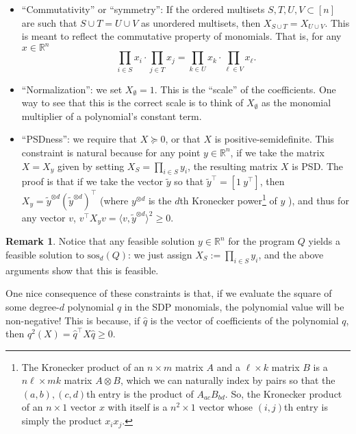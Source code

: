 \documentclass[a4paper,11pt]{article}
\newcommand{\R}{\mathbb{R}}
\newcommand{\sos}{\mathrm{sos}}
\theoremstyle{definition}
\newtheorem{remark}{Remark}
\begin{document}
\begin{itemize}
\item ``Commutativity'' or ``symmetry'': If the ordered multisets $S,T,U,V \subset [n]$ are such that $S \cup T = U \cup V$ as unordered multisets, then $X_{S\cup T} = X_{U \cup V}$.
This is meant to reflect the commutative property of monomials. 
That is, for any $x\in \R^n$
\[
\prod_{i \in S}x_i \cdot \prod_{j\in T}x_j = \prod_{k \in U}x_k \cdot \prod_{\ell \in V} x_{\ell}.
\]
\item ``Normalization'': we set $X_{\emptyset} = 1$.
This is the ``scale'' of the coefficients.
One way to see that this is the correct scale is to think of $X_{\emptyset}$ as the monomial multiplier of a polynomial's constant term.
\item ``PSDness'': we require that $X \succeq 0$, or that $X$ is positive-semidefinite.
This constraint is natural because for any point $y \in \R^n$, if we take the matrix $X=X_y$ given by setting $X_{S} = \prod_{i\in S} y_i$, the resulting matrix $X$ is PSD.
The proof is that if we take the vector $\tilde{y}$ so that $\tilde{y}^{\top} = [1 \ y^\top]$, then $X_y = \tilde{y}^{\otimes d}(\tilde{y}^{\otimes d})^\top$ (where $y^{\otimes d}$ is the $d$th Kronecker power\footnote{The Kronecker product of an $n \times m$ matrix $A$ and a $\ell \times k$ matrix $B$ is a $n\ell \times mk$ matrix $A \otimes B$, which we can naturally index by pairs so that the $(a,b),(c,d)$th entry is the product of $A_{ac}B_{bd}$. 
So, the Kronecker product of an $n \times 1$ vector $x$ with itself is a $n^2 \times 1$ vector whose $(i,j)$th entry is simply the product $x_ix_j$.}
of $y$
), and thus for any vector $v$, $v^\top X_yv = \langle v, \tilde{y}^{\otimes d}\rangle^2 \ge 0$.  

\end{itemize}

\begin{remark}
Notice that any feasible solution $y \in \R^n$ for the program $Q$ yields a feasible solution to $\sos_d(Q)$: we just assign $X_S := \prod_{i\in S}y_i$, and the above arguments show that this is feasible.
\end{remark}

One nice consequence of these constraints is that, if we evaluate the square of some degree-$d$ polynomial $q$ in the SDP monomials, the polynomial value will be non-negative!
This is because, if $\hat q$ is the vector of coefficients of the polynomial $q$, then $q^2(X) = \hat{q}^\top X \hat{q} \ge 0$.
\end{document}
